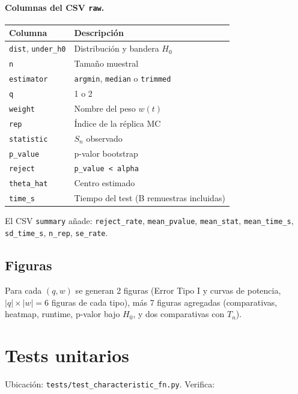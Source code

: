 \documentclass[11pt,a4paper]{article}
\begin{document}
\paragraph{Columnas del CSV \texttt{raw}.}
\begin{center}\small
\begin{tabular}{@{}ll@{}}
\toprule
Columna & Descripción \\
\midrule
\texttt{dist}, \texttt{under\_h0} & Distribución y bandera $H_0$ \\
\texttt{n} & Tamaño muestral \\
\texttt{estimator} & \texttt{argmin}, \texttt{median} o \texttt{trimmed} \\
\texttt{q} & 1 o 2 \\
\texttt{weight} & Nombre del peso $w(t)$ \\
\texttt{rep} & Índice de la réplica MC \\
\texttt{statistic} & $S_n$ observado \\
\texttt{p\_value} & p-valor bootstrap \\
\texttt{reject} & \texttt{p\_value < alpha} \\
\texttt{theta\_hat} & Centro estimado \\
\texttt{time\_s} & Tiempo del test (B remuestras incluidas) \\
\bottomrule
\end{tabular}
\end{center}

El CSV \texttt{summary} añade: \texttt{reject\_rate}, \texttt{mean\_pvalue},
\texttt{mean\_stat}, \texttt{mean\_time\_s}, \texttt{sd\_time\_s},
\texttt{n\_rep}, \texttt{se\_rate}.

\subsection{Figuras}

Para cada $(q, w)$ se generan 2 figuras (Error Tipo I y curvas de
potencia, $|q|\times|w|=6$ figuras de cada tipo), más 7 figuras
agregadas (comparativas, heatmap, runtime, p-valor bajo $H_0$, y dos
comparativas con $T_n$).

\section{Tests unitarios}

Ubicación: \texttt{tests/test\_characteristic\_fn.py}. Verifica:
\end{document}
